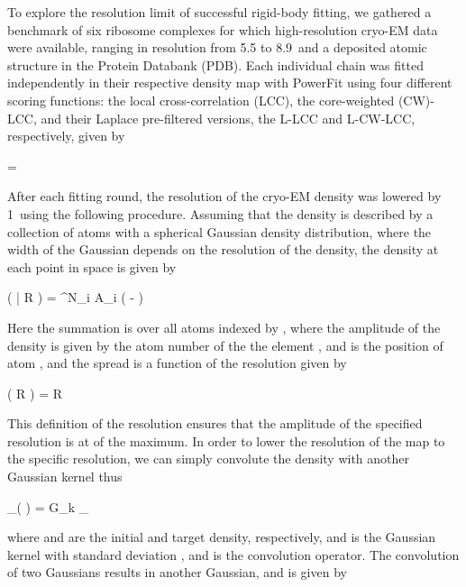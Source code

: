 

To explore the resolution limit of successful rigid-body fitting, we gathered a
benchmark of six ribosome complexes for which high-resolution cryo-EM data were
available, ranging in resolution from 5.5 to 8.9\Angstrom\, and a deposited
atomic structure in the Protein Databank (PDB). Each individual chain was
fitted independently in their respective density map with PowerFit using four
different scoring functions: the local cross-correlation (LCC), the
core-weighted (CW)-LCC, and their Laplace pre-filtered versions, the L-LCC and
L-CW-LCC, respectively, given by

\startformula
{} =  
\stopformula

After each fitting round, the resolution of the cryo-EM density was lowered by
1\Angstrom\ using the following procedure. Assuming that the density is
described by a collection of atoms with a spherical Gaussian density
distribution, where the width of the Gaussian depends on the resolution of the
density, the density at each point in space is given by

\placeformula[eq:density]
\startformula
\rho \left( | R \right) = \sum^N_i A_i \exp\left( - \right)
\stopformula

Here the summation is over all  atoms indexed by , where the
amplitude of the density is given by the atom number of the the element
, and  is the position of atom , and the spread
 is a function of the resolution  given by

\startformula
\sigma\left( R \right) =  R
\stopformula

This definition of the resolution ensures that the amplitude of the specified
resolution is at  of the maximum. In order to lower the resolution of
the map to the specific resolution, we can simply convolute the density with
another Gaussian kernel thus

\startformula
\rho_{}\left(  \right) = G_k \ast \rho_{}
\stopformula

where  and  are the initial and
target density, respectively, and  is the Gaussian kernel with standard
deviation , and \m{\ast} is the convolution operator. The
convolution of two Gaussians results in another Gaussian, and is given by

